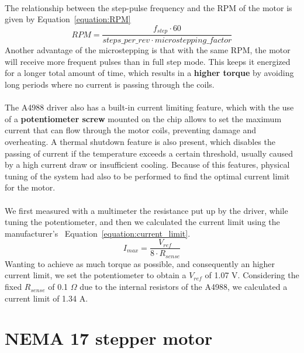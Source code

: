 \paragraph{}
The relationship between the step-pulse frequency and the RPM of the motor is given by Equation~\ref{equation:RPM}
\begin{equation}
    RPM = \frac{f_{step} \cdot 60}{steps\_per\_rev \cdot microstepping\_factor}
    \label{equation:RPM}
\end{equation}
Another advantage of the microstepping is that with the same RPM, the motor will receive more
frequent pulses than in full step mode. This keeps it energized for a longer total amount of time,
which results in a \textbf{higher torque} by avoiding long periods where no current is passing through the coils.
\paragraph{}

The A4988 driver also has a built-in current limiting feature, which with the use of a 
\textbf{potentiometer screw} mounted on the chip allows to set the maximum current
that can flow through the motor coils, preventing damage and overheating.
A thermal shutdown feature is also present, which disables the passing of current if
the temperature exceeds a certain threshold, usually caused by a high current draw or
insufficient cooling.
Because of this features, physical tuning of the system had also to be performed
to find the optimal current limit for the motor.
\paragraph{}

We first measured with a multimeter the resistance put up by the driver, while tuning the
potentiometer, and then we calculated the current limit using
the manufacturer's~\cite{A4988} Equation~\ref{equation:current_limit}.
\begin{equation}
    I_{max} = \frac{V_{ref}}{8 \cdot R_{sense}}
    \label{equation:current_limit}
\end{equation}
Wanting to achieve as much torque as possible, and consequently an higher current limit, we
set the potentiometer to obtain a $V_{ref}$ of 1.07 V.
Considering the fixed $R_{sense}$ of 0.1 $\Omega$ due to the internal resistors
of the A4988, we calculated a current limit of 1.34 A.

\section{NEMA 17 stepper motor}


